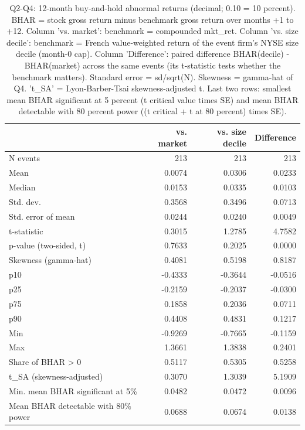 \begin{table}
\caption{Q2-Q4: 12-month buy-and-hold abnormal returns (decimal; 0.10 = 10 percent). BHAR = stock gross return minus benchmark gross return over months +1 to +12. Column 'vs. market': benchmark = compounded mkt\_ret. Column 'vs. size decile': benchmark = French value-weighted return of the event firm's NYSE size decile (month-0 cap). Column 'Difference': paired difference BHAR(decile) - BHAR(market) across the same events (its t-statistic tests whether the benchmark matters). Standard error = sd/sqrt(N). Skewness = gamma-hat of Q4. 't\_SA' = Lyon-Barber-Tsai skewness-adjusted t. Last two rows: smallest mean BHAR significant at 5 percent (t critical value times SE) and mean BHAR detectable with 80 percent power ((t critical + t at 80 percent) times SE).}
\label{tab:bhar}
\begin{tabular}{lrrr}
\toprule
 & vs. market & vs. size decile & Difference \\
\midrule
N events & 213 & 213 & 213 \\
Mean & 0.0074 & 0.0306 & 0.0233 \\
Median & 0.0153 & 0.0335 & 0.0103 \\
Std. dev. & 0.3568 & 0.3496 & 0.0713 \\
Std. error of mean & 0.0244 & 0.0240 & 0.0049 \\
t-statistic & 0.3015 & 1.2785 & 4.7582 \\
p-value (two-sided, t) & 0.7633 & 0.2025 & 0.0000 \\
Skewness (gamma-hat) & 0.4081 & 0.5198 & 0.8187 \\
p10 & -0.4333 & -0.3644 & -0.0516 \\
p25 & -0.2159 & -0.2037 & -0.0300 \\
p75 & 0.1858 & 0.2036 & 0.0711 \\
p90 & 0.4408 & 0.4831 & 0.1217 \\
Min & -0.9269 & -0.7665 & -0.1159 \\
Max & 1.3661 & 1.3838 & 0.2401 \\
Share of BHAR > 0 & 0.5117 & 0.5305 & 0.5258 \\
t\_SA (skewness-adjusted) & 0.3070 & 1.3039 & 5.1909 \\
Min. mean BHAR significant at 5\% & 0.0482 & 0.0472 & 0.0096 \\
Mean BHAR detectable with 80\% power & 0.0688 & 0.0674 & 0.0138 \\
\bottomrule
\end{tabular}
\end{table}
